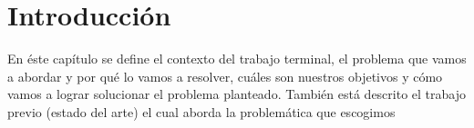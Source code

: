 \chapter{Introducci\'on}

En éste capítulo se define el contexto del trabajo terminal, el problema que vamos a abordar y por qué lo vamos a resolver, cuáles son nuestros objetivos y cómo vamos a lograr solucionar el problema planteado. También está descrito el trabajo previo (estado del arte) el cual aborda la problemática que escogimos